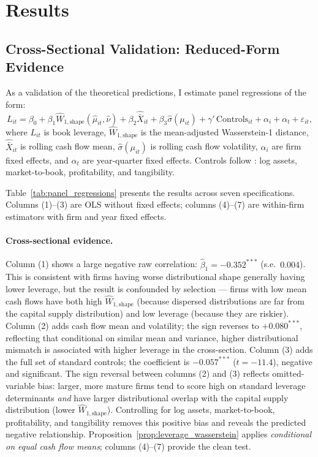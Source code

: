 \section{Results}
\label{sec:results}

\subsection{Cross-Sectional Validation: Reduced-Form Evidence}
\label{sec:results_panel}

As a validation of the theoretical predictions, I estimate panel regressions of the form:
\begin{equation}
  L_{it} = \beta_0 + \beta_1 \widehat{W}_{1,\text{shape}}(\hat{\mu}_{it}, \hat{\nu})
            + \beta_2 \hat{\bar{X}}_{it} + \beta_3 \hat{\sigma}(\mu_{it})
            + \gamma'\,\text{Controls}_{it} + \alpha_i + \alpha_t + \varepsilon_{it},
  \label{eq:panel_regression}
\end{equation}
where $L_{it}$ is book leverage, $\widehat{W}_{1,\text{shape}}$ is the mean-adjusted Wasserstein-1 distance, $\hat{\bar{X}}_{it}$ is rolling cash flow mean, $\hat{\sigma}(\mu_{it})$ is rolling cash flow volatility, $\alpha_i$ are firm fixed effects, and $\alpha_t$ are year-quarter fixed effects. Controls follow \citet{FrankGoyal2009capital}: log assets, market-to-book, profitability, and tangibility.

Table~\ref{tab:panel_regressions} presents the results across seven specifications. Columns (1)--(3) are OLS without fixed effects; columns (4)--(7) are within-firm estimators with firm and year fixed effects.



\paragraph{Cross-sectional evidence.}
Column (1) shows a large negative raw correlation: $\hat{\beta}_1 = -0.352^{***}$ (s.e.\ $0.004$). This is consistent with firms having worse distributional shape generally having lower leverage, but the result is confounded by selection — firms with low mean cash flows have both high $\widehat{W}_{1,\text{shape}}$ (because dispersed distributions are far from the capital supply distribution) and low leverage (because they are riskier). Column (2) adds cash flow mean and volatility; the sign reverses to $+0.080^{***}$, reflecting that conditional on similar mean and variance, higher distributional mismatch is associated with higher leverage in the cross-section. Column (3) adds the full set of standard controls; the coefficient is $-0.057^{***}$ ($t = -11.4$), negative and significant. The sign reversal between columns (2) and (3) reflects omitted-variable bias: larger, more mature firms tend to score high on standard leverage determinants \emph{and} have larger distributional overlap with the capital supply distribution (lower $\widehat{W}_{1,\text{shape}}$). Controlling for log assets, market-to-book, profitability, and tangibility removes this positive bias and reveals the predicted negative relationship. Proposition~\ref{prop:leverage_wasserstein} applies \emph{conditional on equal cash flow means}; columns (4)--(7) provide the clean test.

